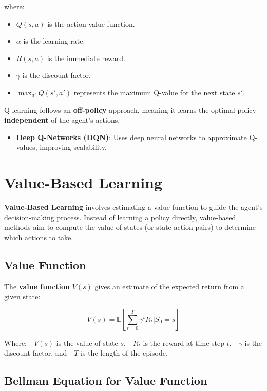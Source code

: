 \documentclass[
]{book}
\providecommand{\tightlist}{%
  \setlength{\itemsep}{0pt}\setlength{\parskip}{0pt}}
\begin{document}
where:

\begin{itemize}
\tightlist
\item
  \(Q(s, a)\) is the action-value function.
\item
  \(\alpha\) is the learning rate.
\item
  \(R(s, a)\) is the immediate reward.
\item
  \(\gamma\) is the discount factor.
\item
  \(\max_{a'} Q(s', a')\) represents the maximum Q-value for the next state \(s'\).
\end{itemize}

Q-learning follows an \textbf{off-policy} approach, meaning it learns the optimal policy \textbf{independent} of the agent's actions.

\begin{itemize}
\tightlist
\item
  \textbf{Deep Q-Networks (DQN)}: Uses deep neural networks to approximate Q-values, improving scalability.
\end{itemize}

\section{Value-Based Learning}\label{value-based-learning}

\textbf{Value-Based Learning} involves estimating a value function to guide the agent's decision-making process. Instead of learning a policy directly, value-based methods aim to compute the value of states (or state-action pairs) to determine which actions to take.

\subsection{Value Function}\label{value-function}

The \textbf{value function} \(V(s)\) gives an estimate of the expected return from a given state:

\[
V(s) = \mathbb{E} \left[ \sum_{t=0}^{T} \gamma^t R_t | S_0 = s \right]
\]

Where:
- \(V(s)\) is the value of state \(s\),
- \(R_t\) is the reward at time step \(t\),
- \(\gamma\) is the discount factor, and
- \(T\) is the length of the episode.

\subsection{Bellman Equation for Value Function}\label{bellman-equation-for-value-function}
\end{document}
